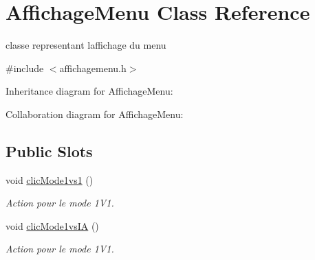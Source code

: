 \hypertarget{class_affichage_menu}{}\section{Affichage\+Menu Class Reference}
\label{class_affichage_menu}


classe representant l\textquotesingle{}affichage du menu  




{\ttfamily \#include $<$affichagemenu.\+h$>$}



Inheritance diagram for Affichage\+Menu\+:


Collaboration diagram for Affichage\+Menu\+:
\subsection*{Public Slots}
\begin{DoxyCompactItemize}
\item 
void \hyperlink{class_affichage_menu_ae62a39124cc5bb46805c464f23cd0ea0}{clic\+Mode1vs1} ()
\begin{DoxyCompactList}\small\item\em Action pour le mode 1\+V1. \end{DoxyCompactList}\item 
void \hyperlink{class_affichage_menu_a737cc4c685ddd031cad5286d513e9002}{clic\+Mode1vs\+IA} ()
\begin{DoxyCompactList}\small\item\em Action pour le mode 1\+V1. \end{DoxyCompactList}\end{DoxyCompactItemize}
